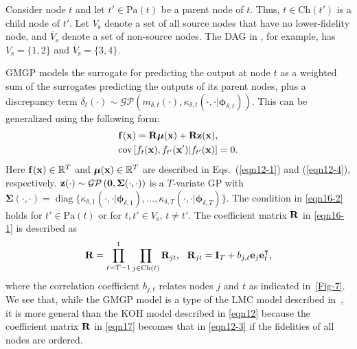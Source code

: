 \documentclass[journal ]{new-aiaa}
\DeclareMathOperator{\diag}{diag}
\begin{document}
Consider node $t$ and let $t' \in \text{Pa}(t)$ be a parent node of $t$.
Thus, $t \in \text{Ch}(t')$ is a child node of $t'$.
Let $V_\text{s}$ denote a set of all source nodes that have no lower-fidelity node, and $\bar{V}_\text{s}$ denote a set of non-source nodes.
The DAG in , for example, has $V_\text{s}=\{1,2\}$ and $\bar{V}_\text{s}=\{3,4\}$.

GMGP models the surrogate for predicting the output at node $t$ as a weighted sum of the surrogates predicting the outputs of its parent nodes, plus a discrepancy term $\delta_t(\cdot)\sim \mathcal{GP}\left(m_{\delta,t}(\cdot),\kappa_{\delta,t}(\cdot,\cdot|{\boldsymbol \phi}_{\delta,t})\right)$.
This can be generalized using the following form:
\begin{subequations}\label{eqn16}
	\begin{align}
		&{\bf f}({\bf x}) =  {\bf R} {\boldsymbol \mu}({\bf x}) + {\bf R} {\bf z}({\bf x}) \label{eqn16-1},\\
		&\text{cov}\left[f_{t}({\bf x}),f_{t'}({\bf x}')|f_{t'}({\bf x})\right]=0 \label{eqn16-2}.
\end{align}	
\end{subequations}
Here ${\bf f}({\bf x}) \in \mathbb{R}^T$ and ${\boldsymbol \mu}({\bf x}) \in \mathbb{R}^T$ are described in Eqs.~(\ref{eqn12-1}) and (\ref{eqn12-4}), respectively.
 ${\bf z}(\cdot) \sim \mathcal{GP}\left({\bf 0},{\boldsymbol \Sigma}(\cdot,\cdot)\right)$ is a $T$-variate GP with ${\boldsymbol \Sigma}(\cdot,\cdot) = \diag\{\kappa_{\delta,1}(\cdot,\cdot|{\boldsymbol \phi}_{\delta,1}),\dots,\kappa_{\delta,T}(\cdot,\cdot|{\boldsymbol \phi}_{\delta,T})\}$.
The condition in \cref{eqn16-2} holds for $t' \in  \text{Pa}(t)$ or for $t,t' \in  V_\text{s}, \, t \neq t'$.
The coefficient matrix ${\bf R}$ in \cref{eqn16-1} is described as
\begin{equation}\label{eqn17}
		{\bf R} = \prod_{t=T-1}^1 \prod_{j \in \text{Ch}(t)} {\bf R}_{jt}, \ \ {\bf R}_{jt} = {\bf I}_T + b_{j,t} {\bf e}_j {\bf e}^\intercal_{t},
\end{equation}
where the correlation coefficient $b_{j,t}$ relates nodes $j$ and $t$ as indicated in~\cref{Fig-7}.
We see that, while the GMGP model is a type of the LMC model described in~, it is more general than the KOH model described in \cref{eqn12} because the coefficient matrix ${\bf R}$ in \cref{eqn17} becomes that in \cref{eqn12-3} if the fidelities of all nodes are ordered.
		
\end{document}
